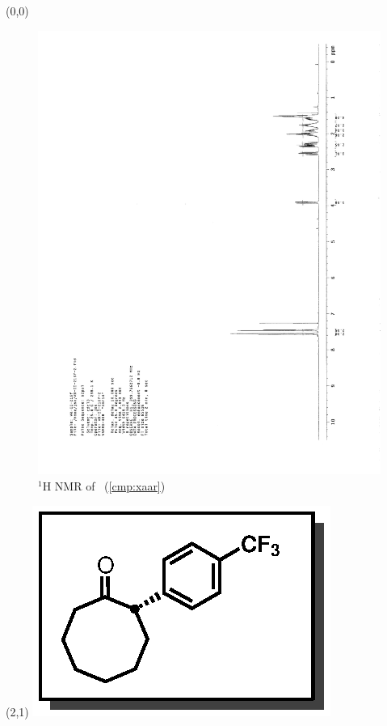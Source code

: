 \begin{textblock}{20}(0,0)
\begin{figure}[htb]
\caption{$^1$H NMR of \CMPxaar\ (\ref{cmp:xaar})}
\includegraphics[scale=0.75, trim = 0mm 0mm 0mm 5mm,
clip]{chp_asymmetric/images/nmr/xaarH}
\vspace{-100pt}
\end{figure}
\end{textblock}
\begin{textblock}{1}(2,1)
\includegraphics[scale=0.8, angle=90]{chp_asymmetric/images/xaar}
\end{textblock}
